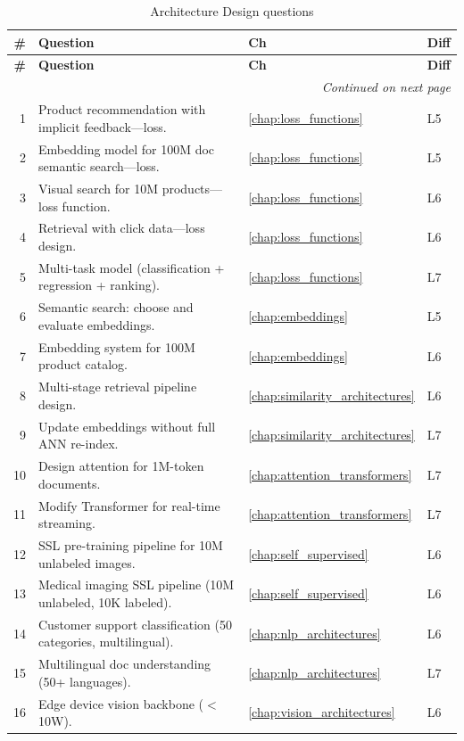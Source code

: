\begin{longtable}{rp{8.5cm}ll}
\caption{Architecture Design questions} \\
\toprule
\textbf{\#} & \textbf{Question} & \textbf{Ch} & \textbf{Diff} \\
\midrule
\endfirsthead
\toprule
\textbf{\#} & \textbf{Question} & \textbf{Ch} & \textbf{Diff} \\
\midrule
\endhead
\midrule
\multicolumn{4}{r}{\textit{Continued on next page}} \\
\endfoot
\bottomrule
\endlastfoot

1 & Product recommendation with implicit feedback---loss. & \ref{chap:loss_functions} & L5 \\
2 & Embedding model for 100M doc semantic search---loss. & \ref{chap:loss_functions} & L5 \\
3 & Visual search for 10M products---loss function. & \ref{chap:loss_functions} & L6 \\
4 & Retrieval with click data---loss design. & \ref{chap:loss_functions} & L6 \\
5 & Multi-task model (classification + regression + ranking). & \ref{chap:loss_functions} & L7 \\
6 & Semantic search: choose and evaluate embeddings. & \ref{chap:embeddings} & L5 \\
7 & Embedding system for 100M product catalog. & \ref{chap:embeddings} & L6 \\
8 & Multi-stage retrieval pipeline design. & \ref{chap:similarity_architectures} & L6 \\
9 & Update embeddings without full ANN re-index. & \ref{chap:similarity_architectures} & L7 \\
10 & Design attention for 1M-token documents. & \ref{chap:attention_transformers} & L7 \\
11 & Modify Transformer for real-time streaming. & \ref{chap:attention_transformers} & L7 \\
12 & SSL pre-training pipeline for 10M unlabeled images. & \ref{chap:self_supervised} & L6 \\
13 & Medical imaging SSL pipeline (10M unlabeled, 10K labeled). & \ref{chap:self_supervised} & L6 \\
14 & Customer support classification (50 categories, multilingual). & \ref{chap:nlp_architectures} & L6 \\
15 & Multilingual doc understanding (50+ languages). & \ref{chap:nlp_architectures} & L7 \\
16 & Edge device vision backbone ($<$10W). & \ref{chap:vision_architectures} & L6 \\

\end{longtable}
